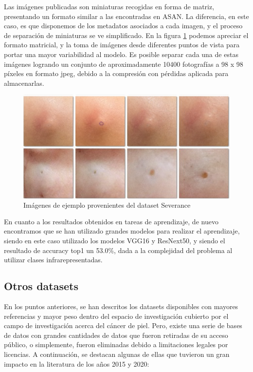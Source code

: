 Las imágenes publicadas son miniaturas recogidas en forma de matriz, presentando un formato similar a las encontradas en ASAN. La diferencia, en este caso, es que disponemos de los metadatos asociados a cada imagen, y el proceso de separación de miniaturas se ve simplificado. En la figura \ref{fig:sevimg} podemos apreciar el formato matricial, y la toma de imágenes desde diferentes puntos de vista para portar una mayor variabilidad al modelo. Es posible separar cada una de estas imágenes logrando un conjunto de aproximadamente 10400 fotografías a 98 x 98 píxeles en formato jpeg, debido a la compresión con pérdidas aplicada para almacenarlas.

\begin{figure}[H]
	\centering
	\includegraphics[scale = 0.5]{imagenes/Severance.png}
	\caption{Imágenes de ejemplo provenientes del dataset Severance   }
	 \label{fig:sevimg}
\end{figure}

En cuanto a los resultados obtenidos en tareas de aprendizaje, de nuevo encontramos que se han utilizado grandes modelos para realizar el aprendizaje, siendo en este caso utilizado los modelos VGG16 y ResNext50, y siendo el resultado de accuracy top1 un 53.0\%,  dada a la complejidad del problema al utilizar clases infrarepresentadas.

\subsection{Otros datasets}

En los puntos anteriores, se han descritos los datasets disponibles con mayores referencias y mayor peso dentro del espacio de investigación cubierto por el campo de investigación acerca del cáncer de piel. Pero, existe una serie de bases de datos con grandes cantidades de datos que fueron retiradas de su acceso público, o simplemente, fueron eliminadas debido a limitaciones legales por licencias. A continuación, se destacan algunas de ellas que tuvieron un gran impacto en la literatura de los años 2015 y 2020:

